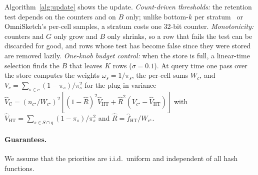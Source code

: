 \documentclass[sigconf]{acmart}
\newcommand{\omni}{OmniSketch\xspace}
\begin{document}
Algorithm~\ref{alg:update} shows the update. \emph{Count-driven thresholds:} the retention test depends on
the counters and on $B$ only; unlike bottom-$k$ per stratum~\cite{ting-ats} or \omni's per-cell samples,
a stratum costs one 32-bit counter. \emph{Monotonicity:} counters and $G$ only grow and $B$ only shrinks,
so a row that fails the test can be discarded for good, and rows whose test has become false since they
were stored are removed lazily. \emph{One-knob budget control:} when the store is full, a linear-time
selection finds the $B$ that leaves $K$ rows ($\sigma=0.1$). At query time one pass over the store
computes the weights $\omega_s=1/\pi_s$, the per-cell sums $W_c$, and $V_c=\sum_{s\in c}(1-\pi_s)/\pi_s^2$
for the plug-in variance
$\hat V_{\mathrm{C}} = (n_{c^\star}/W_{c^\star})^{2}[(1-\hat R)^2\hat V_{\mathrm{HT}} +
\hat R^{2}(V_{c^\star}-\hat V_{\mathrm{HT}})]$ with $\hat V_{\mathrm{HT}}=\sum_{s\in S\cap
q}(1-\pi_s)/\pi_s^2$ and $\hat R=\hat f_{\mathrm{HT}}/W_{c^\star}$.

\paragraph{Guarantees.} We assume that the priorities are i.i.d.\ uniform and independent of all hash
functions.
\end{document}
